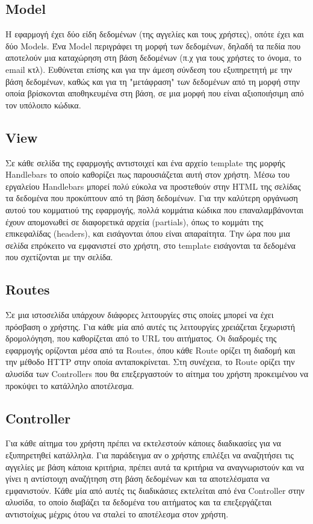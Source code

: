 \documentclass[manuscript,screen,review, language=greek, language=english]{acmart}
\begin{document}
\subsection{Model}
	Η εφαρμογή έχει δύο είδη δεδομένων (της αγγελίες και τους χρήστες), οπότε έχει και
	δύο Models. Ένα Model περιγράφει τη μορφή των δεδομένων, δηλαδή τα πεδία που
	αποτελούν μια καταχώρηση στη βάση δεδομένων (π.χ για τους χρήστες το όνομα, το email
	κτλ). Ευθύνεται επίσης και για την άμεση σύνδεση του εξυπηρετητή με την βάση
	δεδομένων, καθώς και για τη "μετάφραση" των δεδομένων από τη μορφή στην οποία
	βρίσκονται αποθηκευμένα στη βάση, σε μια μορφή που είναι αξιοποιήσιμη από τον
	υπόλοιπο κώδικα.

\subsection{View}
	Σε κάθε σελίδα της εφαρμογής αντιστοιχεί και ένα αρχείο template της μορφής
	Handlebars το οποίο καθορίζει πως παρουσιάζεται αυτή στον χρήστη.
	Μέσω του εργαλείου Handlebars μπορεί πολύ εύκολα
	να προστεθούν στην HTML της σελίδας τα δεδομένα που προκύπτουν από τη βάση δεδομένων.
	Για την καλύτερη οργάνωση αυτού του κομματιού της εφαρμογής, πολλά κομμάτια κώδικα
	που επαναλαμβάνονται έχουν απομονωθεί σε διαφορετικά αρχεία (partials), όπως το
	κομμάτι της επικεφαλίδας (headers), και εισάγονται όπου είναι απαραίτητα. Την ώρα που
	μια σελίδα επρόκειτο να εμφανιστεί στο χρήστη, στο template εισάγονται τα δεδομένα
	που σχετίζονται με την σελίδα.

\subsection{Routes}
	Σε μια ιστοσελίδα υπάρχουν διάφορες λειτουργίες στις οποίες μπορεί να έχει πρόσβαση
	ο χρήστης. Για κάθε μία από αυτές τις λειτουργίες χρειάζεται ξεχωριστή δρομολόγηση,
	που καθορίζεται από το URL του αιτήματος. Οι διαδρομές της εφαρμογής ορίζονται μέσα
	από τα Routes, όπου κάθε Route ορίζει τη διαδομή και την μέθοδο HTTP στην οποία
	ανταποκρίνεται. Στη συνέχεια, το Route ορίζει την αλυσίδα των Controllers που θα
	επεξεργαστούν το αίτημα του χρήστη προκειμένου να προκύψει το κατάλληλο αποτέλεσμα.

\subsection{Controller}
	Για κάθε αίτημα του χρήστη πρέπει να εκτελεστούν κάποιες διαδικασίες για να
	εξυπηρετηθεί κατάλληλα. Για παράδειγμα αν ο χρήστης επιλέξει να αναζητήσει τις
	αγγελίες με βάση κάποια κριτήρια, πρέπει αυτά τα κριτήρια να αναγνωριστούν και να
	γίνει η αντίστοιχη αναζήτηση στη βάση δεδομένων και τα αποτελέσματα να εμφανιστούν.
	Κάθε μία από αυτές τις διαδικάσιες εκτελείται από ένα Controller στην αλυσίδα, το
	οποίο διαβάζει τα δεδομένα του αιτήματος και τα επεξεργάζεται αντιστοίχως μέχρις
	ότου να σταλεί το αποτέλεσμα στον χρήστη.
\end{document}
